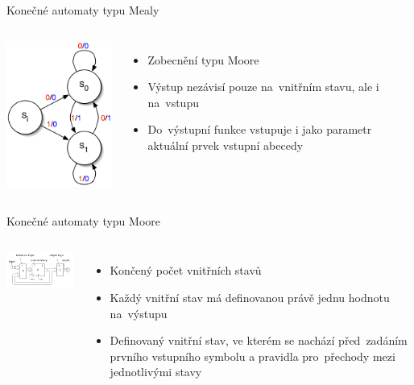 \documentclass{beamer}
\begin{document}
\begin{frame}{Konečné automaty typu Mealy}
  \begin{columns}
    \column{5cm}
      \includegraphics[width=5cm]{mealy.png}
    \column{5cm}
      \begin{itemize}
        \item{Zobecnění typu Moore}
        \item{Výstup nezávisí pouze na~vnitřním stavu, ale i na~vstupu}
        \item{Do~výstupní funkce vstupuje i jako parametr aktuální prvek vstupní abecedy}
      \end{itemize}
  \end{columns}
\end{frame}

\begin{frame}{Konečné automaty typu Moore}
  \begin{columns}
    \column{5cm}
      \includegraphics[width=5cm]{moore.png}
    \column{5cm}
      \begin{itemize}
        \item{Končený počet vnitřních stavů}
        \item{Každý vnitřní stav má definovanou právě jednu hodnotu na~výstupu}
        \item{Definovaný vnitřní stav, ve kterém se nachází před~zadáním prvního vstupního symbolu a pravidla pro~přechody mezi jednotlivými stavy}
      \end{itemize}
  \end{columns}
\end{frame}
\end{document}
